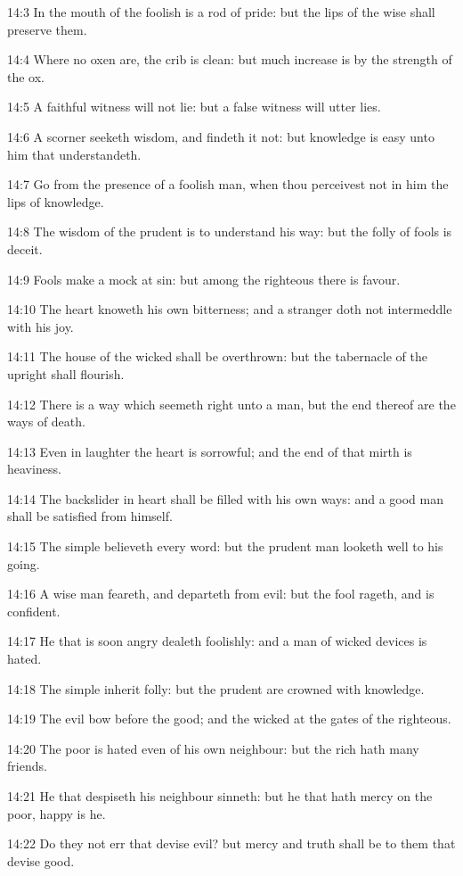 14:3 In the mouth of the foolish is a rod of pride: but the lips of the wise shall preserve them.

14:4 Where no oxen are, the crib is clean: but much increase is by the strength of the ox.

14:5 A faithful witness will not lie: but a false witness will utter lies.

14:6 A scorner seeketh wisdom, and findeth it not: but knowledge is easy unto him that understandeth.

14:7 Go from the presence of a foolish man, when thou perceivest not in him the lips of knowledge.

14:8 The wisdom of the prudent is to understand his way: but the folly of fools is deceit.

14:9 Fools make a mock at sin: but among the righteous there is favour.

14:10 The heart knoweth his own bitterness; and a stranger doth not intermeddle with his joy.

14:11 The house of the wicked shall be overthrown: but the tabernacle of the upright shall flourish.

14:12 There is a way which seemeth right unto a man, but the end thereof are the ways of death.

14:13 Even in laughter the heart is sorrowful; and the end of that mirth is heaviness.

14:14 The backslider in heart shall be filled with his own ways: and a good man shall be satisfied from himself.

14:15 The simple believeth every word: but the prudent man looketh well to his going.

14:16 A wise man feareth, and departeth from evil: but the fool rageth, and is confident.

14:17 He that is soon angry dealeth foolishly: and a man of wicked devices is hated.

14:18 The simple inherit folly: but the prudent are crowned with knowledge.

14:19 The evil bow before the good; and the wicked at the gates of the righteous.

14:20 The poor is hated even of his own neighbour: but the rich hath many friends.

14:21 He that despiseth his neighbour sinneth: but he that hath mercy on the poor, happy is he.

14:22 Do they not err that devise evil? but mercy and truth shall be to them that devise good.

